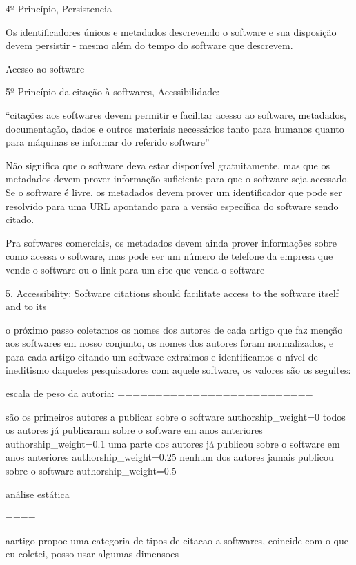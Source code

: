 4º Princípio, Persistencia

Os identificadores únicos e metadados descrevendo o software e sua disposição
devem persistir - mesmo além do tempo do software que descrevem.

Acesso ao software

5º Princípio da citação à softwares, Acessibilidade:

``citações aos softwares devem permitir e facilitar acesso ao software,
metadados, documentação, dados e outros materiais necessários tanto
para humanos quanto para máquinas se informar do referido software''

Não significa que o software deva estar disponível gratuitamente, mas que
os metadados devem prover informação suficiente para que o software seja
acessado. Se o software é livre, os metadados devem prover um identificador
que pode ser resolvido para uma URL apontando para a versão específica
do software sendo citado.

Pra softwares comerciais, os metadados devem ainda prover informações sobre
como acessa o software, mas pode ser um número de telefone da empresa que
vende o software ou o link para um site que venda o software

\cite{smith2016software}

5. Accessibility: Software citations should facilitate access to the software itself and to its


o próximo passo coletamos os nomes dos autores de cada artigo que faz menção
aos softwares em nosso conjunto, os nomes dos autores foram normalizados,
e para cada artigo citando um software extraimos e identificamos o nível
de ineditismo daqueles pesquisadores com aquele software, os valores
são os seguites:

escala de peso da autoria:
==========================

são os primeiros autores a publicar sobre o software
  authorship\_weight=0
todos os autores já publicaram sobre o software em anos anteriores
  authorship\_weight=0.1
uma parte dos autores já publicou sobre o software em anos anteriores
  authorship\_weight=0.25
nenhum dos autores jamais publicou sobre o software
  authorship\_weight=0.5



análise estática


====



aartigo propoe uma categoria de tipos de citacao a softwares,
coincide com o que eu coletei, posso usar algumas dimensoes
\cite{smith2016software}

